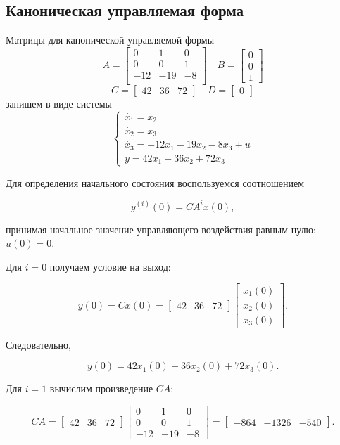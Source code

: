 \documentclass[a4paper, 12pt]{article}
\begin{document}
\subsection{Каноническая управляемая форма}
Матрицы для канонической управляемой формы
\[
A = \begin{bmatrix}
    0&1&0\\
    0&0&1\\
    -12&-19&-8\\
\end{bmatrix} \quad B = 
\begin{bmatrix}
    0\\0\\1    
\end{bmatrix}
\]
\[
C = \begin{bmatrix}
    42&36&72
\end{bmatrix} \quad D=\begin{bmatrix}
    0
\end{bmatrix}
\]
запишем в виде системы
\[
\begin{cases}
    \dot{x_1} = x_2\\
    \dot{x_2} = x_3\\
    \dot{x_3} = -12x_1 - 19x_2 - 8x_3 + u\\
    y = 42x_1 + 36x_2 + 72x_3
\end{cases}
\]

Для определения начального состояния воспользуемся соотношением

\[
y^{(i)}(0) = CA^i x(0),
\]

принимая начальное значение управляющего воздействия равным нулю:
\(u(0)=0\).

Для $i=0$ получаем условие на выход:

\[
y(0) = Cx(0)
=
\begin{bmatrix}
42 & 36 & 72
\end{bmatrix}
\begin{bmatrix}
x_1(0)\\
x_2(0)\\
x_3(0)
\end{bmatrix}.
\]

Следовательно,

\[
y(0) =
42x_1(0) + 36x_2(0) + 72x_3(0).
\]

Для $i=1$ вычислим произведение $CA$:

\[
CA =
\begin{bmatrix}
42 & 36 & 72
\end{bmatrix}
\begin{bmatrix}
0 & 1 & 0\\
0 & 0 & 1\\
-12 & -19 & -8
\end{bmatrix}
=
\begin{bmatrix}
-864 & -1326 & -540
\end{bmatrix}.
\]
\end{document}
